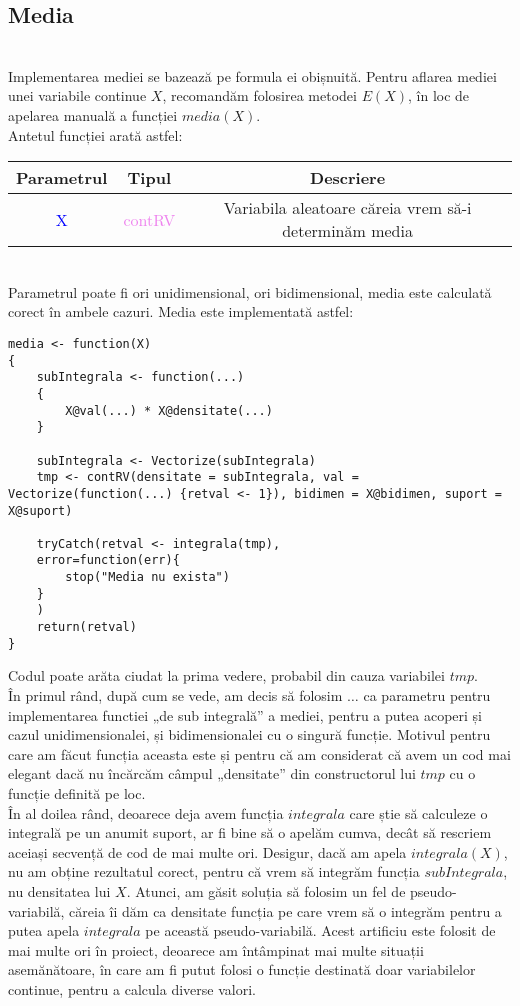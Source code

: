\documentclass[12pt]{article}
\begin{document}
\subsection{Media} \hfill \\
\indent Implementarea mediei se bazează pe formula ei obișnuită. Pentru aflarea mediei unei variabile continue $X$, recomandăm folosirea metodei $E(X)$, în loc de apelarea manuală a funcției $media(X)$.\\
\indent Antetul funcției arată astfel:
\begin{center}
	\begin{tabular}{|| c | c | c ||}
		\hline
		Parametrul & Tipul & Descriere \\
		\hline
		\textcolor{blue}{X} & \textcolor{violet}{contRV} & Variabila aleatoare căreia vrem să-i determinăm media\\
		\hline
	\end{tabular}
\end{center}\hfill \\
\indent Parametrul poate fi ori unidimensional, ori bidimensional, media este calculată corect în ambele cazuri. Media este implementată astfel: 
\begin{lstlisting}
media <- function(X)
{
	subIntegrala <- function(...)
	{
		X@val(...) * X@densitate(...)
	}
	
	subIntegrala <- Vectorize(subIntegrala)
	tmp <- contRV(densitate = subIntegrala, val = Vectorize(function(...) {retval <- 1}), bidimen = X@bidimen, suport = X@suport)
	
	tryCatch(retval <- integrala(tmp),
	error=function(err){
		stop("Media nu exista")
	}
	)
	return(retval)
}
\end{lstlisting} \pagebreak \par
Codul poate arăta ciudat la prima vedere, probabil din cauza variabilei $tmp$.\\
\indent În primul rând, după cum se vede, am decis să folosim $\dots$ ca parametru pentru implementarea functiei „de sub integrală” a mediei, pentru a putea acoperi și cazul unidimensionalei, și bidimensionalei cu o singură funcție. Motivul pentru care am făcut funcția aceasta este și pentru că am considerat că avem un cod mai elegant dacă nu încărcăm câmpul „densitate” din constructorul lui $tmp$ cu o funcție definită pe loc.\\
\indent În al doilea rând, deoarece deja avem funcția $integrala$ care știe să calculeze o integrală pe un anumit suport, ar fi bine să o apelăm cumva, decât să rescriem aceiași secvență de cod de mai multe ori. Desigur, dacă am apela $integrala(X)$, nu am obține rezultatul corect, pentru că vrem să integrăm funcția $subIntegrala$, nu densitatea lui $X$. Atunci, am găsit soluția să folosim un fel de pseudo-variabilă, căreia îi dăm ca densitate funcția pe care vrem să o integrăm pentru a putea apela $integrala$ pe această pseudo-variabilă. Acest artificiu este folosit de mai multe ori în proiect, deoarece am întâmpinat mai multe situații asemănătoare, în care am fi putut folosi o funcție destinată doar variabilelor continue, pentru a calcula diverse valori.\\
\end{document}
